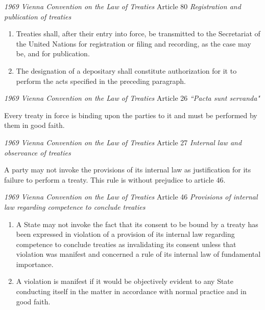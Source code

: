 \begin{conventiondetails}{\textit{1969 Vienna Convention on the Law of Treaties} Article 80}
    \flushleft
    \textit{Registration and publication of treaties}

    \begin{enumerate}
        \item Treaties shall, after their entry into force, be transmitted to the Secretariat of the United Nations for registration or filing and recording, as the case may be, and for publication. 
        \item The designation of a depositary shall constitute authorization for it to perform the acts specified in the preceding paragraph.
    \end{enumerate}
\end{conventiondetails}

\begin{conventiondetails}{\textit{1969 Vienna Convention on the Law of Treaties} Article 26}\label{VCLT Art 26}
    \flushleft
    \textit{``Pacta sunt servanda"}
    \vspace{\baselineskip}

    Every treaty in force is binding upon the parties to it and must be performed by them in good faith.
\end{conventiondetails}

\begin{conventiondetails}{\textit{1969 Vienna Convention on the Law of Treaties} Article 27}\label{VCLT Art 27}
    \flushleft
    \textit{Internal law and observance of treaties}

    \vspace{\baselineskip}

    A party may not invoke the provisions of its internal law as justification for its failure to perform  a treaty. This rule is without prejudice to article 46.
\end{conventiondetails}

\begin{conventiondetails}{\textit{1969 Vienna Convention on the Law of Treaties} Article 46}\label{VCLT Art 46}
    \flushleft
    \textit{Provisions of internal law regarding competence to conclude treaties}

    \begin{enumerate}
        \item A State may not invoke the fact that its consent to be bound by a treaty has been expressed in violation of a provision of its internal law regarding competence to conclude treaties as invalidating its consent unless that violation was manifest and concerned a rule of its internal law of fundamental importance. 
        \item A violation is manifest if it would be objectively evident to any State conducting itself in the matter in accordance with normal practice and in good faith.
    \end{enumerate}
\end{conventiondetails}

